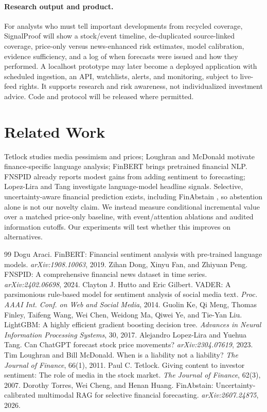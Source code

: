 \documentclass{article}
\begin{document}
\paragraph{Research output and product.} For analysts who must tell important developments from recycled coverage, SignalProof will show a stock/event timeline, de-duplicated source-linked coverage, price-only versus news-enhanced risk estimates, model calibration, evidence sufficiency, and a log of when forecasts were issued and how they performed. A localhost prototype may later become a deployed application with scheduled ingestion, an API, watchlists, alerts, and monitoring, subject to live-feed rights. It supports research and risk awareness, not individualized investment advice. Code and protocol will be released where permitted.

\section{Related Work}
Tetlock \citep{tetlock2007} studies media pessimism and prices; Loughran and McDonald \citep{loughran2011} motivate finance-specific language analysis; FinBERT \citep{araci2019} brings pretrained financial NLP. FNSPID \citep{dong2024} already reports modest gains from adding sentiment to forecasting; Lopez-Lira and Tang \citep{lopezlira2023} investigate language-model headline signals. Selective, uncertainty-aware financial prediction exists, including FinAbstain \citep{torres2026}, so abstention alone is not our novelty claim. We instead measure conditional incremental value over a matched price-only baseline, with event/attention ablations and audited information cutoffs. Our experiments will test whether this improves on alternatives.

\begin{thebibliography}{99}
 Dogu Araci. FinBERT: Financial sentiment analysis with pre-trained language models. \emph{arXiv:1908.10063}, 2019.
 Zihan Dong, Xinyu Fan, and Zhiyuan Peng. FNSPID: A comprehensive financial news dataset in time series. \emph{arXiv:2402.06698}, 2024.
 Clayton J. Hutto and Eric Gilbert. VADER: A parsimonious rule-based model for sentiment analysis of social media text. \emph{Proc. AAAI Int. Conf. on Web and Social Media}, 2014.
 Guolin Ke, Qi Meng, Thomas Finley, Taifeng Wang, Wei Chen, Weidong Ma, Qiwei Ye, and Tie-Yan Liu. LightGBM: A highly efficient gradient boosting decision tree. \emph{Advances in Neural Information Processing Systems}, 30, 2017.
 Alejandro Lopez-Lira and Yuehua Tang. Can ChatGPT forecast stock price movements? \emph{arXiv:2304.07619}, 2023.
 Tim Loughran and Bill McDonald. When is a liability not a liability? \emph{The Journal of Finance}, 66(1), 2011.
 Paul C. Tetlock. Giving content to investor sentiment: The role of media in the stock market. \emph{The Journal of Finance}, 62(3), 2007.
 Dorothy Torres, Wei Cheng, and Henan Huang. FinAbstain: Uncertainty-calibrated multimodal RAG for selective financial forecasting. \emph{arXiv:2607.24875}, 2026.
\end{thebibliography}
\end{document}
